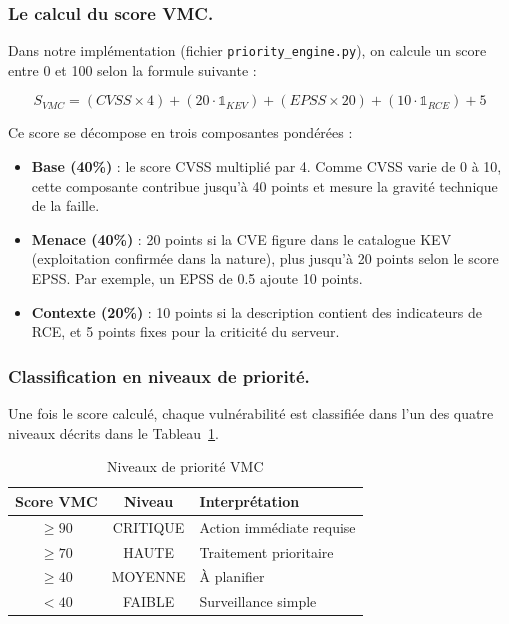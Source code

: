 \documentclass[runningheads]{llncs}
\begin{document}
\subsubsection{Le calcul du score VMC.}

Dans notre implémentation (fichier \texttt{priority\_engine.py}), on calcule un score entre 0 et 100 selon la formule suivante :

\begin{equation}
    S_{VMC} = (CVSS \times 4) + (20 \cdot \mathbb{1}_{KEV}) + (EPSS \times 20) + (10 \cdot \mathbb{1}_{RCE}) + 5
    \label{eq:vmc}
\end{equation}

Ce score se décompose en trois composantes pondérées :
\begin{itemize}
    \item \textbf{Base (40\%)} : le score CVSS multiplié par 4. Comme CVSS varie de 0 à 10, cette composante contribue jusqu'à 40 points et mesure la gravité technique de la faille.
    \item \textbf{Menace (40\%)} : 20 points si la CVE figure dans le catalogue KEV (exploitation confirmée dans la nature), plus jusqu'à 20 points selon le score EPSS. Par exemple, un EPSS de 0.5 ajoute 10 points.
    \item \textbf{Contexte (20\%)} : 10 points si la description contient des indicateurs de RCE, et 5 points fixes pour la criticité du serveur.
\end{itemize}

\subsubsection{Classification en niveaux de priorité.}

Une fois le score calculé, chaque vulnérabilité est classifiée dans l'un des quatre niveaux décrits dans le Tableau~\ref{tab:vmc_levels}.

\begin{table}[h]
\centering
\caption{Niveaux de priorité VMC}
\label{tab:vmc_levels}
\begin{tabular}{|c|c|l|}
\hline
\textbf{Score VMC} & \textbf{Niveau} & \textbf{Interprétation} \\
\hline
$\geq 90$ & CRITIQUE & Action immédiate requise \\
$\geq 70$ & HAUTE    & Traitement prioritaire \\
$\geq 40$ & MOYENNE  & À planifier \\
$< 40$    & FAIBLE   & Surveillance simple \\
\hline
\end{tabular}
\end{table}
\end{document}
